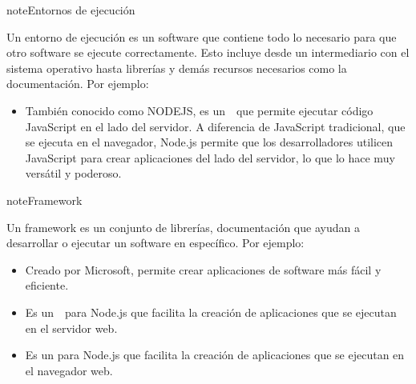 \documentclass[letterpaper,10pt,spanish]{sphinxmanual}
\begin{document}
\begin{sphinxadmonition}{note}{Entornos de ejecución}

\sphinxAtStartPar
Un entorno de ejecución es un software que contiene todo lo necesario para que otro software se ejecute correctamente. Esto incluye desde un intermediario con el sistema operativo hasta librerías y demás recursos necesarios como la documentación. Por ejemplo:
\begin{itemize}
\item {} 
\sphinxAtStartPar
{} También conocido como NODEJS, es un  que permite ejecutar código JavaScript en el lado del servidor. A diferencia de JavaScript tradicional, que se ejecuta en el navegador, Node.js permite que los desarrolladores utilicen JavaScript para crear aplicaciones del lado del servidor, lo que lo hace muy versátil y poderoso.

\end{itemize}
\end{sphinxadmonition}

\begin{sphinxadmonition}{note}{Framework}

\sphinxAtStartPar
Un framework es un conjunto de librerías, documentación que ayudan a desarrollar o ejecutar un software en específico. Por ejemplo:
\begin{itemize}
\item {} 
\sphinxAtStartPar
{} Creado por Microsoft, permite crear aplicaciones de software más fácil y eficiente.

\item {} 
\sphinxAtStartPar
{} Es un  para Node.js que facilita la creación de aplicaciones que se ejecutan en el servidor web.

\item {} 
\sphinxAtStartPar
{} Es un  para Node.js que facilita la creación de aplicaciones que se ejecutan en el navegador web.

\end{itemize}
\end{sphinxadmonition}
\end{document}
